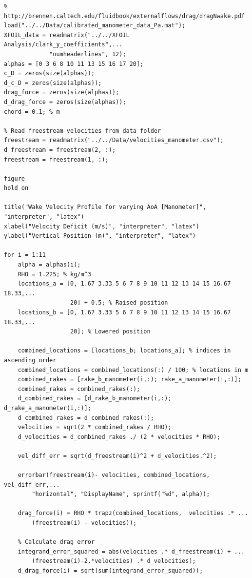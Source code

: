 \documentclass[runningheads]{llncs}
\begin{document}
\begin{verbatim}
% http://brennen.caltech.edu/fluidbook/externalflows/drag/dragNwake.pdf
load("../../Data/calibrated_manometer_data_Pa.mat");
XFOIL_data = readmatrix("../../XFOIL Analysis/clark_y_coefficients",...
             "numheaderlines", 12);
alphas = [0 3 6 8 10 11 13 15 16 17 20];
c_D = zeros(size(alphas));
d_c_D = zeros(size(alphas));
drag_force = zeros(size(alphas));
d_drag_force = zeros(size(alphas));
chord = 0.1; % m

% Read freestream velocities from data folder
freestream = readmatrix("../../Data/velocities_manometer.csv");
d_freestream = freestream(2, :);
freestream = freestream(1, :);

figure
hold on

title("Wake Velocity Profile for varying AoA [Manometer]", "interpreter", "latex")
xlabel("Velocity Deficit (m/s)", "interpreter", "latex")
ylabel("Vertical Position (m)", "interpreter", "latex")

for i = 1:11
    alpha = alphas(i);
    RHO = 1.225; % kg/m^3
    locations_a = [0, 1.67 3.33 5 6 7 8 9 10 11 12 13 14 15 16.67 18.33,...
                   20] + 0.5; % Raised position
    locations_b = [0, 1.67 3.33 5 6 7 8 9 10 11 12 13 14 15 16.67 18.33,...
                   20]; % Lowered position

    combined_locations = [locations_b; locations_a]; % indices in ascending order
    combined_locations = combined_locations(:) / 100; % locations in m
    combined_rakes = [rake_b_manometer(i,:); rake_a_manometer(i,:)];
    combined_rakes = combined_rakes(:);
    d_combined_rakes = [d_rake_b_manometer(i,:); d_rake_a_manometer(i,:)];
    d_combined_rakes = d_combined_rakes(:);
    velocities = sqrt(2 * combined_rakes / RHO);
    d_velocities = d_combined_rakes ./ (2 * velocities * RHO);
    
    vel_diff_err = sqrt(d_freestream(i)^2 + d_velocities.^2);

    errorbar(freestream(i)- velocities, combined_locations, vel_diff_err,...
        "horizontal", "DisplayName", sprintf("%d", alpha));
    
    drag_force(i) = RHO * trapz(combined_locations,  velocities .* ...
        (freestream(i) - velocities));
    
    % Calculate drag error
    integrand_error_squared = abs(velocities .* d_freestream(i) + ...
        (freestream(i)-2.*velocities) .* d_velocities);
    d_drag_force(i) = sqrt(sum(integrand_error_squared));
    

\end{verbatim}
\end{document}
